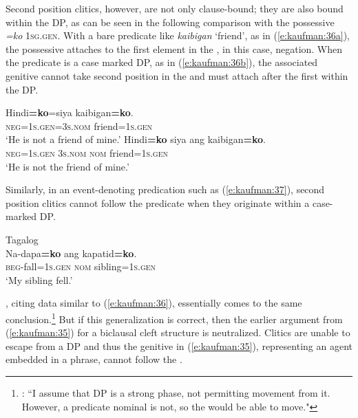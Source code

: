 \documentclass[output=paper]{langsci/langscibook}
\begin{document}
\noindent
Second position clitics, however, are not only clause-bound; they are also bound within the DP, as can be seen in the following comparison with the possessive  \textit{=ko} \textsc{1sg.gen}. With a bare predicate like \textit{kaibigan} `friend', as in (\ref{e:kaufman:36a}), the possessive  attaches to the first element in the , in this case, negation. When the predicate is a case marked DP, as in (\ref{e:kaufman:36b}), the associated genitive  cannot take second position in the  and must attach after the first  within the DP.

\begin{exe}
	\ex\label{e:kaufman:36}
	\begin{xlist}
		\ex\label{e:kaufman:36a}
        \gll Hindi{\ob}\textbf{=ko}{\cb}=siya kaibigan{\ob}{\USQMark}\textbf{=ko}{\cb}.\\
		\textsc{neg=1s.gen=3s.nom} friend\textsc{=1s.gen}\\
		\glt `He is not a friend of mine.'
		\ex\label{e:kaufman:36b}
        \gll Hindi{\ob}{\USStar}\textbf{=ko}{\cb} siya ang kaibigan{\ob}\textbf{=ko}{\cb}.\\
		\textsc{neg=1s.gen} \textsc{3s.nom} \textsc{nom} friend\textsc{=1s.gen}\\
		\glt `He is not the friend of mine.'
	\end{xlist}
\end{exe}

\noindent
Similarly, in an event-denoting predication such as (\ref{e:kaufman:37}), second position clitics cannot follow the predicate when they originate within a case-marked DP.

\begin{exe}
	\ex\label{e:kaufman:37}{Tagalog}\\
	\gll Na-dapa{\ob}{\USStar}\textbf{=ko}{\cb} ang kapatid{\ob}\textbf{=ko}{\cb}.\\
	\textsc{beg-}fall=\textsc{1s.gen} \textsc{nom} sibling=\textsc{1s.gen}\\
	\glt `My sibling fell.'
\end{exe}

\noindent
\citet{Aldridge:2004}, citing data similar to (\ref{e:kaufman:36}), essentially comes to the same conclusion.\footnote{\citet[262]{Aldridge:2004}: ``I assume that DP is a strong phase, not permitting movement from it. However, a predicate nominal is not, so the  would be able to move."} But if this generalization is correct, then the earlier  argument from (\ref{e:kaufman:35}) for a biclausal cleft structure is neutralized. Clitics are unable to escape from a DP and thus the genitive  in (\ref{e:kaufman:35}), representing an agent embedded in a  phrase, cannot follow the . 
\end{document}
